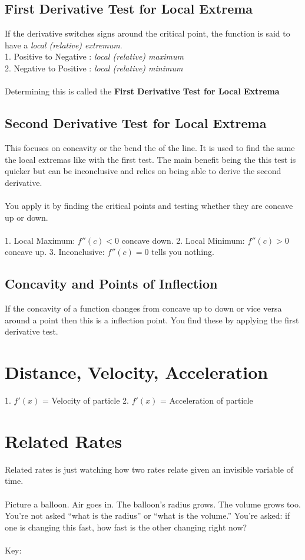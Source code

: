 \subsection{First Derivative Test for Local Extrema}
If the derivative switches signs around the critical point, the function is said to have a \textit{local (relative) extremum}.\\
1. Positive to Negative : \textit{local (relative) maximum}\\
2. Negative to Positive : \textit{local (relative) minimum}\\
\\
Determining this is called the \textbf{First Derivative Test for Local Extrema}

\subsection{Second Derivative Test for Local Extrema}
This focuses on concavity or the bend the of the line. It is used to find the same the local extremas like with the first test. The main benefit being the this test is quicker but can be inconclusive and relies on being able to derive the second derivative.
\\\\
You apply it by finding the critical points and testing whether they are concave up or down.\\
\\
1. Local Maximum: $f''(c) < 0$ concave down.
2. Local Minimum:  $f''(c) > 0$concave up.
3. Inconclusive: $f''(c) = 0$ tells you nothing.

\subsection{Concavity and Points of Inflection}
If the concavity of a function changes from concave up to down or vice versa around a point then this is a inflection point. You find these by applying the first derivative test.

\section{Distance, Velocity, Acceleration}
1. $f'(x)$ = Velocity of particle
2. $f'(x)$ = Acceleration of particle

\section{Related Rates}
Related rates is just watching how two rates relate given an invisible variable of time.\\
\\
Picture a balloon. Air goes in. The balloon’s radius grows. The volume grows too. You’re not asked “what is the radius” or “what is the volume.” You’re asked: if one is changing this fast, how fast is the other changing right now?\\\\
Key:

